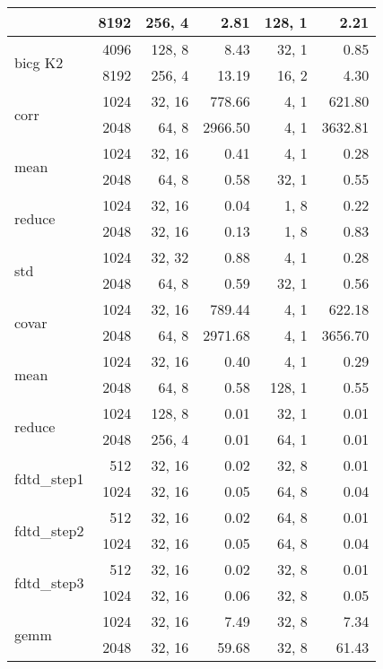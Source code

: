 \begin{table}[htb]
\begin{tabular}{|l|r||r|r||r|r|}
 & 8192 & 256, 4 &   2.81 & 128, 1 &   2.21 \\
\hline
\multirow{2}{*}{{\scriptsize bicg K2}} & 4096 & 128, 8 &   8.43 & 32, 1 &   0.85 \\
 & 8192 & 256, 4 &  13.19 & 16, 2 &   4.30 \\
\hline
\multirow{2}{*}{{\scriptsize corr}} & 1024 & 32, 16 & 778.66 & 4, 1 & 621.80 \\
 & 2048 & 64, 8 & 2966.50 & 4, 1 & 3632.81 \\
\hline
\multirow{2}{*}{{\scriptsize mean}} & 1024 & 32, 16 &   0.41 & 4, 1 &   0.28 \\
 & 2048 & 64, 8 &   0.58 & 32, 1 &   0.55 \\
\hline
\multirow{2}{*}{{\scriptsize reduce}} & 1024 & 32, 16 &   0.04 & 1, 8 &   0.22 \\
 & 2048 & 32, 16 &   0.13 & 1, 8 &   0.83 \\
\hline
\multirow{2}{*}{{\scriptsize std}} & 1024 & 32, 32 &   0.88 & 4, 1 &   0.28 \\
 & 2048 & 64, 8 &   0.59 & 32, 1 &   0.56 \\
\hline
\multirow{2}{*}{{\scriptsize covar}} & 1024 & 32, 16 & 789.44 & 4, 1 & 622.18 \\
 & 2048 & 64, 8 & 2971.68 & 4, 1 & 3656.70 \\
\hline
\multirow{2}{*}{{\scriptsize mean}} & 1024 & 32, 16 &   0.40 & 4, 1 &   0.29 \\
 & 2048 & 64, 8 &   0.58 & 128, 1 &   0.55 \\
\hline
\multirow{2}{*}{{\scriptsize reduce}} & 1024 & 128, 8 &   0.01 & 32, 1 &   0.01 \\
 & 2048 & 256, 4 &   0.01 & 64, 1 &   0.01 \\
\hline
\multirow{2}{*}{{\scriptsize fdtd\_step1}} & 512 & 32, 16 &   0.02 & 32, 8 &   0.01 \\
 & 1024 & 32, 16 &   0.05 & 64, 8 &   0.04 \\
\hline
\multirow{2}{*}{{\scriptsize fdtd\_step2}} & 512 & 32, 16 &   0.02 & 64, 8 &   0.01 \\
 & 1024 & 32, 16 &   0.05 & 64, 8 &   0.04 \\
\hline
\multirow{2}{*}{{\scriptsize fdtd\_step3}} & 512 & 32, 16 &   0.02 & 32, 8 &   0.01 \\
 & 1024 & 32, 16 &   0.06 & 32, 8 &   0.05 \\
\hline
\multirow{2}{*}{{\scriptsize gemm}} & 1024 & 32, 16 &   7.49 & 32, 8 &   7.34 \\
 & 2048 & 32, 16 &  59.68 & 32, 8 &  61.43 \\

\end{tabular}
\end{table}
